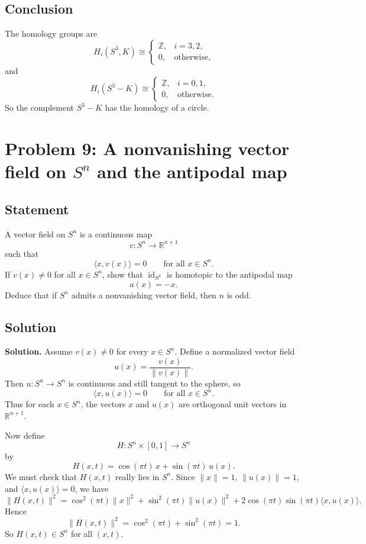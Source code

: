 \documentclass[12pt,a4paper]{article}
\theoremstyle{notespace}
\begin{document}
\subsection{Conclusion}

The homology groups are
\[
H_i(S^3,K)\cong
\begin{cases}
	\mathbb Z, & i=3,2,\\
	0, & \text{otherwise},
\end{cases}
\]
and
\[
H_i(S^3-K)\cong
\begin{cases}
	\mathbb Z, & i=0,1,\\
	0, & \text{otherwise}.
\end{cases}
\]
So the complement \(S^3-K\) has the homology of a circle.

\section{Problem 9: A nonvanishing vector field on \(S^n\) and the antipodal map}

\subsection{Statement}

A vector field on \(S^n\) is a continuous map
\[
v:S^n\to \mathbb R^{n+1}
\]
such that
\[
\langle x,v(x)\rangle =0
\qquad\text{for all }x\in S^n.
\]
If \(v(x)\neq 0\) for all \(x\in S^n\), show that \(\operatorname{id}_{S^n}\) is homotopic to the antipodal map
\[
a(x)=-x.
\]
Deduce that if \(S^n\) admits a nonvanishing vector field, then \(n\) is odd.

\subsection{Solution}

\textbf{Solution.}
Assume \(v(x)\neq 0\) for every \(x\in S^n\). Define a normalized vector field
\[
u(x)=\frac{v(x)}{\|v(x)\|}.
\]
Then \(u:S^n\to S^n\) is continuous and still tangent to the sphere, so
\[
\langle x,u(x)\rangle =0
\qquad\text{for all }x\in S^n.
\]
Thus for each \(x\in S^n\), the vectors \(x\) and \(u(x)\) are orthogonal unit vectors in \(\mathbb R^{n+1}\).

Now define
\[
H:S^n\times [0,1]\to S^n
\]
by
\[
H(x,t)=\cos(\pi t)\,x+\sin(\pi t)\,u(x).
\]
We must check that \(H(x,t)\) really lies in \(S^n\). Since \(\|x\|=1\), \(\|u(x)\|=1\), and \(\langle x,u(x)\rangle =0\), we have
\[
\|H(x,t)\|^2
=
\cos^2(\pi t)\|x\|^2
+
\sin^2(\pi t)\|u(x)\|^2
+
2\cos(\pi t)\sin(\pi t)\langle x,u(x)\rangle.
\]
Hence
\[
\|H(x,t)\|^2
=
\cos^2(\pi t)+\sin^2(\pi t)=1.
\]
So \(H(x,t)\in S^n\) for all \((x,t)\).
\end{document}
